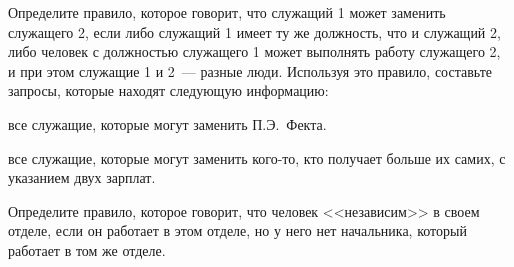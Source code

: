 \begin{exercise}{4.57}%
\label{EX4.57}%
Определите правило, которое говорит, что служащий 1
может заменить служащего 2, если либо служащий 1 имеет ту же
должность, что и служащий 2, либо человек с должностью
служащего 1 может выполнять работу служащего 2, и при этом служащие 1
и 2~--- разные люди.
Используя это правило, составьте запросы, которые находят следующую
информацию:

\begin{plainenum}
\item

все служащие, которые могут заменить П.Э.~Фекта.

\item
все служащие, которые могут заменить кого-то, кто
получает больше их самих, с указанием двух зарплат.
\end{plainenum}
\end{exercise}

\begin{exercise}{4.58}%
\label{EX4.58}%
Определите правило, которое говорит, что человек
<<независим>> в своем отделе, если он работает в этом отделе, но у
него нет начальника, который работает в том же отделе.
\end{exercise}

